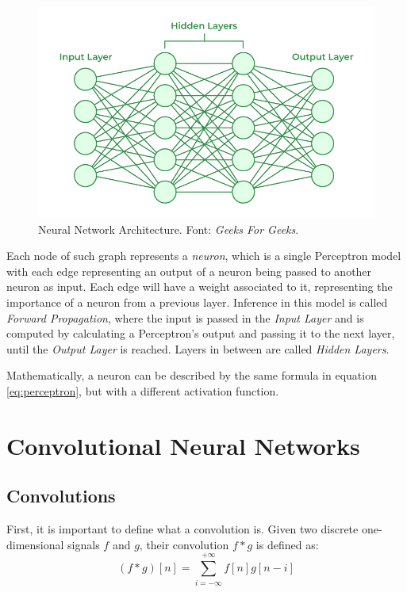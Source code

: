 \begin{figure}[H]
    \centering
    \includegraphics[scale=0.5]{figuras/Neural-Networks-Architecture.png}
    \caption{Neural Network Architecture. Font: \emph{Geeks For Geeks\footnotemark}. \label{fig:neural-network}}
\end{figure}

Each node of such graph represents a \emph{neuron}, which is a single Perceptron model with each edge representing an output of a neuron being passed to another neuron as input.
Each edge will have a weight associated to it, representing the importance of a neuron from a previous layer. 
Inference in this model is called \emph{Forward Propagation}, where the input is passed in the \emph{Input Layer} and is computed by calculating a Perceptron's output and passing it to the next layer, until the \emph{Output Layer} is reached.
Layers in between are called \emph{Hidden Layers}.

Mathematically, a neuron can be described by the same formula in equation \ref{eq:perceptron}, but with a different activation function.

\section{Convolutional Neural Networks}
\label{sec:convolutions}
\subsection{Convolutions}
First, it is important to define what a convolution is. Given two discrete one-dimensional signals \(f\) and \(g\), their convolution \(f * g\) is defined as:
\[
(f*g)[n] = \sum_{i=-\infty}^{+\infty} f[n] g[n-i]
\]

